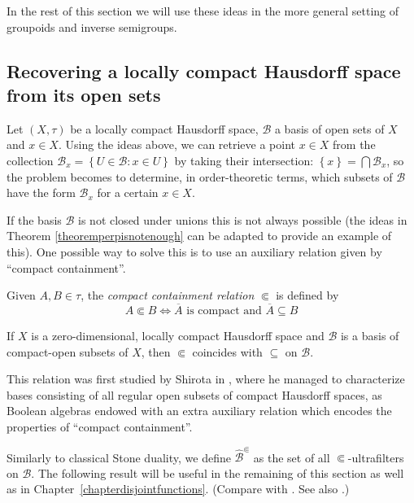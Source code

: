 In the rest of this section we will use these ideas in the more general setting of groupoids and inverse semigroups.

\subsection{Recovering a locally compact Hausdorff space from its open sets}

Let $(X,\tau)$ be a locally compact Hausdorff space, $\mathcal{B}$ a basis of open sets of $X$ and $x\in X$. Using the ideas above, we can retrieve a point $x\in X$ from the collection $\mathcal{B}_x=\left\{U\in\mathcal{B}:x\in U\right\}$ by taking their intersection: $\left\{x\right\}=\bigcap\mathcal{B}_x$, so the problem becomes to determine, in order-theoretic terms, which subsets of $\mathcal{B}$ have the form $\mathcal{B}_x$ for a certain $x\in X$.

If the basis $\mathcal{B}$ is not closed under unions this is not always possible (the ideas in Theorem \ref{theoremperpisnotenough} can be adapted to provide an example of this). One possible way to solve this is to use an auxiliary relation given by ``compact containment''.

\begin{definition}\label{definitioncompactcontainment}
Given $A,B\in\tau$, the \emph{compact containment relation} $\Subset$ is defined by
\[A\Subset B\iff \overline{A}\text{ is compact and }\overline{A}\subseteq B\]
\end{definition}

\begin{example}
If $X$ is a zero-dimensional, locally compact Hausdorff space and $\mathcal{B}$ is a basis of compact-open subsets of $X$, then $\Subset$ coincides with $\subseteq$ on $\mathcal{B}$.
\end{example}

This relation was first studied by Shirota in \cite{MR0052760}, where he managed to characterize bases consisting of all regular open subsets of compact Hausdorff spaces, as Boolean algebras endowed with an extra auxiliary relation which encodes the properties of ``compact containment''.%

Similarly to classical Stone duality, we define $\widehat{\mathcal{B}}^\Subset$ as the set of all $\Subset$-ultrafilters on $\mathcal{B}$. The following result will be useful in the remaining of this section as well as in Chapter~\ref{chapterdisjointfunctions}. (Compare with \cite[Lemma 3]{MR0052760}. See also \cite[Proposition 3.4]{arxiv1803.00394v2}.)

